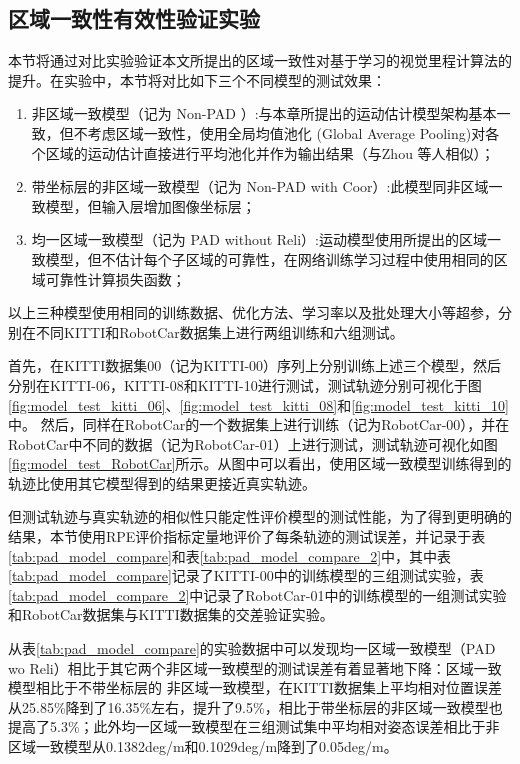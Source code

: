 \subsection{区域一致性有效性验证实验}
\label{sec:es_pad_check}
本节将通过对比实验验证本文所提出的区域一致性对基于学习的视觉里程计算法的提升。在实验中，本节将对比如下三个不同模型的测试效果：
\begin{enumerate}
  \item 非区域一致模型（记为 Non-PAD ）:与本章所提出的运动估计模型架构基本一致，但不考虑区域一致性，使用全局均值池化 (Global Average Pooling)对各个区域的运动估计直接进行平均池化并作为输出结果（与Zhou 等人\cite{zhou2017unsupervised}相似）；
  \item 带坐标层的非区域一致模型（记为 Non-PAD with Coor）:此模型同非区域一致模型，但输入层增加图像坐标层；
  \item 均一区域一致模型（记为 PAD without Reli）:运动模型使用所提出的区域一致模型，但不估计每个子区域的可靠性，在网络训练学习过程中使用相同的区域可靠性计算损失函数；
\end{enumerate}

以上三种模型使用相同的训练数据、优化方法、学习率以及批处理大小等超参，分别在不同KITTI和RobotCar数据集上进行两组训练和六组测试。

首先，在KITTI数据集00（记为KITTI-00）序列上分别训练上述三个模型，然后分别在KITTI-06，KITTI-08和KITTI-10进行测试，测试轨迹分别可视化于图 \ref{fig:model_test_kitti_06}、\ref{fig:model_test_kitti_08}和\ref{fig:model_test_kitti_10}中。
然后，同样在RobotCar的一个数据集上进行训练（记为RobotCar-00），并在RobotCar中不同的数据（记为RobotCar-01）上进行测试，测试轨迹可视化如图\ref{fig:model_test_RobotCar}所示。从图中可以看出，使用区域一致模型训练得到的轨迹比使用其它模型得到的结果更接近真实轨迹。

但测试轨迹与真实轨迹的相似性只能定性评价模型的测试性能，为了得到更明确的结果，本节使用RPE评价指标定量地评价了每条轨迹的测试误差，并记录于表\ref{tab:pad_model_compare}和表\ref{tab:pad_model_compare_2}中，其中表\ref{tab:pad_model_compare}记录了KITTI-00中的训练模型的三组测试实验，表\ref{tab:pad_model_compare_2}中记录了RobotCar-01中的训练模型的一组测试实验和RobotCar数据集与KITTI数据集的交差验证实验。

从表\ref{tab:pad_model_compare}的实验数据中可以发现均一区域一致模型（PAD wo Reli）相比于其它两个非区域一致模型的测试误差有着显著地下降：区域一致模型相比于不带坐标层的
非区域一致模型，在KITTI数据集上平均相对位置误差从25.85\%降到了16.35\%左右，提升了9.5\%，相比于带坐标层的非区域一致模型也提高了5.3\%；此外均一区域一致模型在三组测试集中平均相对姿态误差相比于非区域一致模型从0.1382deg/m和0.1029deg/m降到了0.05deg/m。

